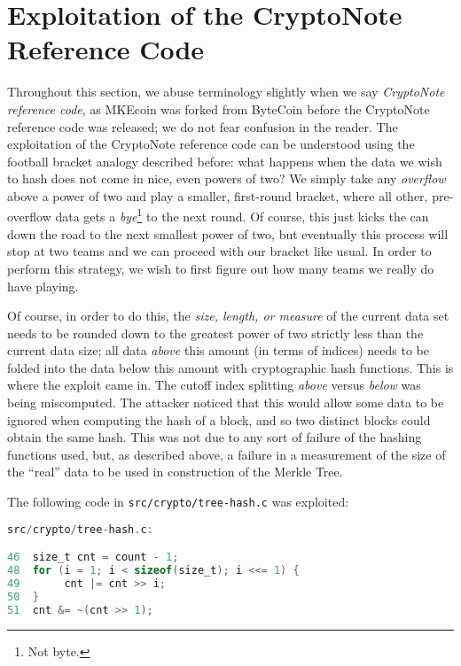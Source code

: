 \documentclass{mrl}
\begin{document}
\section{Exploitation of the CryptoNote Reference Code}
Throughout this section, we abuse terminology slightly when we say \emph{CryptoNote reference code}, as MKEcoin was forked from ByteCoin before the CryptoNote reference code was released; we do not fear confusion in the reader. The exploitation of the CryptoNote reference code can be understood using the football bracket analogy described before: what happens when the data we wish to hash does not come in nice, even powers of two? We simply take any \emph{overflow} above a power of two and play a smaller, first-round bracket, where all other, pre-overflow data gets a \emph{bye}\footnote{Not byte.} to the next round. Of course, this just kicks the can down the road to the next smallest power of two, but eventually this process will stop at two teams and we can proceed with our bracket like usual. In order to perform this strategy, we wish to first figure out how many teams we really do have playing.

Of course, in order to do this, the \emph{size, length, or measure} of the current data set needs to be rounded down to the greatest power of two strictly less than the current data size; all data \emph{above} this amount (in terms of indices) needs to be folded into the data below this amount with cryptographic hash functions. This is where the exploit came in. The cutoff index splitting \emph{above} versus \emph{below} was being miscomputed. The attacker noticed that this would allow some data to be ignored when computing the hash of a block, and so two distinct blocks could obtain the same hash. This was not due to any sort of failure of the hashing functions used, but, as described above, a failure in a measurement of the size of the ``real'' data to be used in construction of the Merkle Tree.

The following code in \texttt{src/crypto/tree-hash.c} was exploited:

\begin{lstlisting}[language=C]
src/crypto/tree-hash.c:

46  size_t cnt = count - 1;
48  for (i = 1; i < sizeof(size_t); i <<= 1) {
49       cnt |= cnt >> i;
50  }
51  cnt &= ~(cnt >> 1);

\end{lstlisting}
\end{document}
